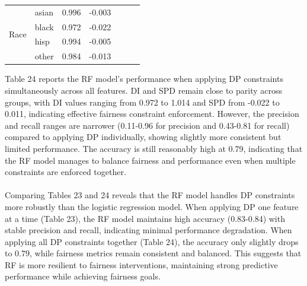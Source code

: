 \documentclass{article}
\begin{document}
\begin{table}[H]
\begin{tabular}{llcc|ccc}
\hline
\multirow{4}{*}{Race}          & asian & 0.996                  & \multicolumn{1}{l|}{-0.003} &                                       &                                    &                              \\
                               & black & 0.972                  & \multicolumn{1}{l|}{-0.022} &                                       &                                    &                              \\
                               & hisp  & 0.994                  & \multicolumn{1}{l|}{-0.005} &                                       &                                    &                              \\
                               & other & 0.984                  & \multicolumn{1}{l|}{-0.013} &                                       &                                    &                             
\end{tabular}
\end{table}
Table 24 reports the RF model’s performance when applying DP constraints simultaneously across all features. DI and SPD remain close to parity across groups, with DI values ranging from 0.972 to 1.014 and SPD from -0.022 to 0.011, indicating effective fairness constraint enforcement. However, the precision and recall ranges are narrower (0.11-0.96 for precision and 0.43-0.81 for recall) compared to applying DP individually, showing slightly more consistent but limited performance. The accuracy is still reasonably high at 0.79, indicating that the RF model manages to balance fairness and performance even when multiple constraints are enforced together.\\ \\
Comparing Tables 23 and 24 reveals that the RF model handles DP constraints more robustly than the logistic regression model. When applying DP one feature at a time (Table 23), the RF model maintains high accuracy (0.83-0.84) with stable precision and recall, indicating minimal performance degradation. When applying all DP constraints together (Table 24), the accuracy only slightly drops to 0.79, while fairness metrics remain consistent and balanced. This suggests that RF is more resilient to fairness interventions, maintaining strong predictive performance while achieving fairness goals.
\end{document}
